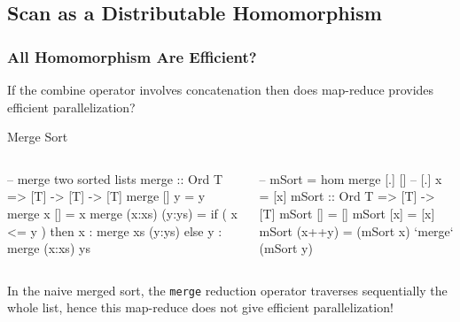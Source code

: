 \documentclass{beamer}
\renewcommand{\emph}[1]{\textcolor{structure}{#1}}
\newcommand{\emp}[1]{\textcolor{DikuRed}{ #1}}
\begin{document}
\subsection{Scan as a Distributable Homomorphism}
\begin{frame}[fragile]
	\tableofcontents[currentsubsection]
\end{frame}

\begin{frame}[fragile,t]
  \frametitle{All Homomorphism Are Efficient?}

If the combine operator involves concatenation then does
map-reduce provides efficient parallelization? 

\begin{block}{Merge Sort} \vspace{-1.5 ex}
\begin{columns}
\begin{colorcode}[fontsize=\scriptsize]
-- merge two sorted lists
merge :: Ord T => [T] -> [T] -> [T]
merge [] y  = y
merge x  [] = x
merge (x:xs) (y:ys) = 
  if ( x <= y ) 
  then x : merge xs (y:ys)
  else y : merge (x:xs) ys 
\end{colorcode}
\begin{colorcode}[fontsize=\scriptsize]
-- \emph{mSort} = \emp{hom merge [.] []}
-- [.] x = [x]  
\emph{mSort} :: Ord T => [T] -> [T]
\emph{mSort} []     = \emp{[]}
\emph{mSort} [x]    = \emp{[x]}
\emph{mSort} (x++y) = (\emph{mSort} x) \emp{`merge`}  
               (\emph{mSort} y)
\end{colorcode}
\end{columns}
\end{block}

In the naive merged sort, the {\tt merge} reduction operator
traverses sequentially the whole list, hence this map-reduce 
does not give efficient parallelization!

\end{frame}
\end{document}
